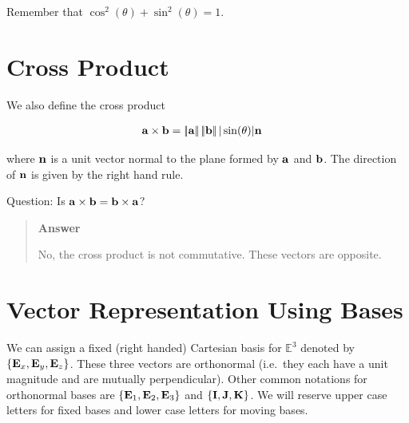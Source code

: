 \documentclass[
  letterpaper,
  DIV=11,
  numbers=noendperiod]{scrreprt}
\newcommand{\lnorm}{\left|\!\left|}
\newcommand{\rnorm}{\right|\!\right|}
\begin{document}
Remember that \(\cos^2(\theta)+\sin^2(\theta)=1\).

\section{Cross Product}\label{cross-product}

We also define the cross product

\begin{align}
    {\bf a}\times{\bf b} &= \lnorm{\bf a}\rnorm \lnorm{\bf b}\rnorm |\sin(\theta)|{\bf n}
\end{align}

where \({\bf n}\) is a unit vector normal to the plane formed by
\({\bf a}\) and \({\bf b}\). The direction of \({\bf n}\) is given by
the right hand rule.

\begin{tcolorbox}[enhanced jigsaw, arc=.35mm, bottomrule=.15mm, bottomtitle=1mm, breakable, colback=white, colbacktitle=quarto-callout-tip-color!10!white, colframe=quarto-callout-tip-color-frame, coltitle=black, left=2mm, leftrule=.75mm, opacityback=0, opacitybacktitle=0.6, rightrule=.15mm, title=\textcolor{quarto-callout-tip-color}{\faLightbulb}\hspace{0.5em}{Think!}, titlerule=0mm, toprule=.15mm, toptitle=1mm]

Question: Is \({\bf a}\times{\bf b} = {\bf b}\times{\bf a}\)?

\begin{quote}
\textbf{Answer}

No, the cross product is not commutative. These vectors are opposite.
\end{quote}

\end{tcolorbox}

\section{Vector Representation Using
Bases}\label{vector-representation-using-bases}

We can assign a fixed (right handed) Cartesian basis for
\(\mathbb{E}^3\) denoted by \(\{{\bf E}_x, {\bf E}_y, {\bf E}_z\}\).
These three vectors are orthonormal (i.e.~they each have a unit
magnitude and are mutually perpendicular). Other common notations for
orthonormal bases are \(\{{\bf E}_1, {\bf E}_2, {\bf E}_3\}\) and
\(\{{\bf I}, {\bf J}, {\bf K}\}\). We will reserve upper case letters
for fixed bases and lower case letters for moving bases.
\end{document}
